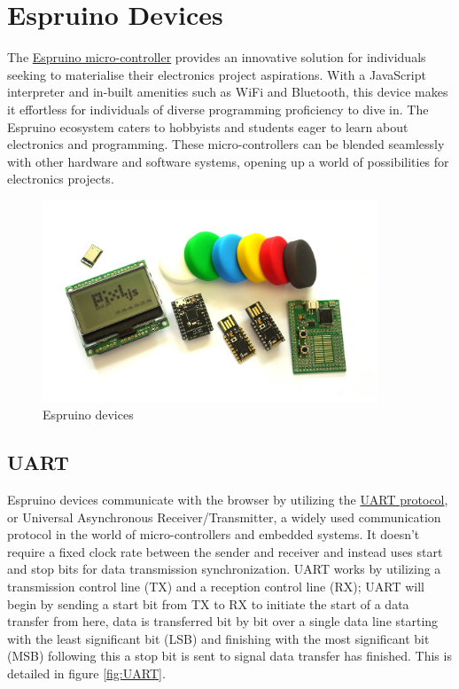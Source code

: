 \documentclass{l4proj}
\begin{document}
\section{Espruino Devices}
\text 
The \href{https://www.espruino.com/}{Espruino micro-controller} provides an innovative solution for individuals seeking to materialise their electronics project aspirations. With a JavaScript interpreter and in-built amenities such as WiFi and Bluetooth, this device makes it effortless for individuals of diverse programming proficiency to dive in. The Espruino ecosystem caters to hobbyists and students eager to learn about electronics and programming. These micro-controllers can be blended seamlessly with other hardware and software systems, opening up a world of possibilities for electronics projects.

\begin{figure}[!ht]
    \centering
    \includegraphics[width=10cm]{dissertation/images/espruino_devices.jpg}
    \caption{Espruino devices}
    \label{fig:espruinodevices}
\end{figure}
    
\subsection{UART}
\text Espruino devices communicate with the browser by utilizing the \href{https://erg.abdn.ac.uk/users/gorry/eg3576/UART.html}{UART protocol}, or Universal Asynchronous Receiver/Transmitter, a widely used communication protocol in the world of micro-controllers and embedded systems. It doesn't require a fixed clock rate between the sender and receiver and instead uses start and stop bits for data transmission synchronization. UART works by utilizing a transmission control line (TX) and a reception control line (RX); UART will begin by sending a start bit from TX to RX to initiate the start of a data transfer from here, data is transferred bit by bit over a single data line starting with the least significant bit (LSB) and finishing with the most significant bit (MSB) following this a stop bit is sent to signal data transfer has finished. This is detailed in figure \ref{fig:UART}.
\end{document}
